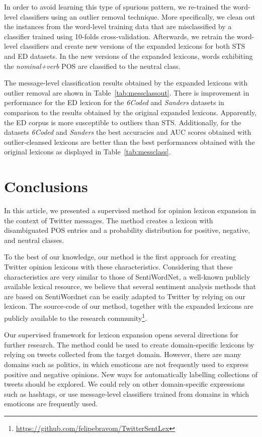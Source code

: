\documentclass{sig-alternate}
\begin{document}
In order to avoid learning this type of spurious pattern, we re-trained the word-level classifiers using an outlier removal technique. More specifically, we clean out the instances from the word-level training data that are misclassified by a classifier trained using 10-folds cross-validation. Afterwards, we retrain the word-level classifiers and create new versions of the expanded lexicons for both STS and ED datasets. In the new versions of the expanded lexicons, words exhibiting the \emph{nominal+verb} POS are classified to the neutral class.

The message-level classification results obtained by the expanded lexicons with outlier removal are shown in Table~\ref{tab:messclassout}. There is improvement in performance for the ED lexicon for the \emph{6Coded} and \emph{Sanders} datasets in comparison to the results obtained by the original expanded lexicons. Apparently, the ED corpus is more susceptible to outliers than STS. Additionally, for the datasets \emph{6Coded} and \emph{Sanders} the best accuracies and AUC scores obtained with outlier-cleansed lexicons are better than the best performances obtained with the original lexicons as displayed in Table~\ref{tab:messclass}.


\section{Conclusions}\label{sec:conc}

In this article, we presented a supervised method for opinion lexicon expansion in the context of Twitter messages. The method creates a lexicon with disambiguated POS entries and a probability distribution for positive, negative, and neutral classes. 

To the best of our knowledge, our method is the first approach for creating Twitter opinion lexicons with these characteristics. Considering that these characteristics are very similar to those of SentiWordNet, a well-known publicly available lexical resource, we believe that several sentiment analysis methods that are based on SentiWordnet can be easily adapted to Twitter by relying on our lexicon. The source-code of our method, together with  the expanded lexicons are publicly available to the research community\footnote{\url{https://github.com/felipebravom/TwitterSentLex}}.

Our supervised framework for lexicon expansion opens several directions for further research. The method could be used to create domain-specific lexicons by relying on tweets collected from the target domain. However, there are many domains such as politics, in which emoticons are not frequently used to express positive and negative opinions. New ways for automatically labelling collections of tweets should be explored. We could rely on other domain-specific expressions such as hashtags, or use message-level classifiers trained from domains in which emoticons are frequently used. 
\end{document}
